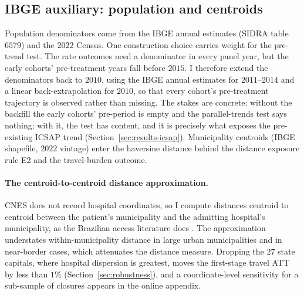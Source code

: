 \subsection{IBGE auxiliary: population and centroids}
\label{sec:data-aux}

Population denominators come from the IBGE annual estimates (SIDRA table
$6579$) and the $2022$ Census. One construction choice carries weight for
the pre-trend test. The rate outcomes need a denominator in every panel
year, but the early cohorts' pre-treatment years fall before $2015$. I
therefore extend the denominators back to $2010$, using the IBGE annual
estimates for $2011$--$2014$ and a linear back-extrapolation for $2010$,
so that every cohort's pre-treatment trajectory is observed rather than
missing. The stakes are concrete: without the backfill the early cohorts'
pre-period is empty and the parallel-trends test says nothing; with it,
the test has content, and it is precisely what exposes the pre-existing
ICSAP trend (Section~\ref{sec:results-icsap}). Municipality centroids
(IBGE shapefile, $2022$ vintage) enter the haversine distance behind the
distance exposure rule E2 and the travel-burden outcome.

\paragraph{The centroid-to-centroid distance approximation.} CNES does
not record hospital coordinates, so I compute distances centroid to
centroid between the patient's municipality and the admitting hospital's
municipality, as the Brazilian access literature does
\citep{macinkoHarris2015, rochaSoares2010}. The approximation understates
within-municipality distance in large urban municipalities and in
near-border cases, which attenuates the distance measure. Dropping the
$27$ state capitals, where hospital dispersion is greatest, moves the
first-stage travel ATT by less than $1\%$
(Section~\ref{sec:robustness}), and a coordinate-level sensitivity for a
sub-sample of closures appears in the online appendix.



